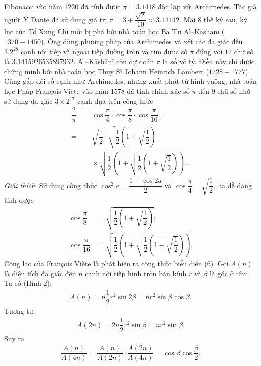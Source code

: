 \begin{multicols}{2}
	\vskip 0.1cm 
	Fibonacci vào năm $1220$ đã tính được $\pi  = 3.1418$  độc lập với Archimedes. 
	\vskip 0.1cm
	Tác giả người Ý Dante đã sử dụng giá trị  $\pi  = 3 + \dfrac{{\sqrt 2 }}{{10}} \approx 3.14142.$
	\vskip 0.1cm 
	Mãi $8$ thế kỷ sau, kỷ lục của Tổ Xung Chi mới bị phá bởi nhà toán học Ba Tư Al--Kāshānī ($1370-1450$). Ông dùng phương pháp của Archimedes và xét các đa giác đều $3.2^{28}$ cạnh nội tiếp và ngoại tiếp đường tròn và tìm được số $\pi$ đúng với $17$ chữ số là $3.1415926535897932$.  Al--Kāshānī còn dự đoán $\pi$ là số vô tỷ. Điều này chỉ được chứng minh bởi nhà toán học Thụy Sĩ Johann Heinrich Lambert ($1728 - 1777$).
	\vskip 0.1cm 
	Cũng gấp đôi số cạnh như Archimedes, nhưng xuất phát từ hình vuông, nhà toán học Pháp François Viète vào năm $1578$ đã tính chính xác số $\pi$  đến $9$ chữ số nhờ sử dụng đa giác  $3 \times 2^{17}$ cạnh dựa trên công thức
	\begin{align*}
			\dfrac{2}{\pi } = &\cos \dfrac{\pi }{4} \cdot \cos \dfrac{\pi }{8} \cdot \cos \dfrac{\pi }{{16}}...\\
			= &\sqrt {\dfrac{1}{2}}  \cdot \sqrt {\dfrac{1}{2}\left( {1 + \sqrt {\dfrac{1}{2}} } \right)}  \\
			 &\!\times\!\sqrt {\dfrac{1}{2}\left( {1 \!+\! \sqrt {\dfrac{1}{2}\left(\! {1 \!+\! \sqrt {\dfrac{1}{2}} } \!\right)} } \right)} ... \tag{$6$}
	\end{align*}
	\textit{Giải thích}: Sử dụng công thức ${\cos ^2}a = \dfrac{{1 + \cos 2a}}{2}$  và $\cos \dfrac{\pi }{4} = \sqrt {\dfrac{1}{2}},$ ta dễ dàng tính được 
	\begin{align*}
		\cos \dfrac{\pi }{8} &= \sqrt {\dfrac{1}{2}\left( {1 + \sqrt {\dfrac{1}{2}} } \right)};\\
		\cos \dfrac{\pi }{{16}} &= \sqrt {\dfrac{1}{2}\left( {1 + \sqrt {\dfrac{1}{2}\left( {1 + \sqrt {\dfrac{1}{2}} } \right)} } \right)}.
	\end{align*}
	Công lao của François Viète là phát hiện ra công thức biểu diễn ($6$).
	\vskip 0.1cm
	Gọi $A(n)$  là diện tích đa giác đều $n$  cạnh nội tiếp hình tròn bán kính  $r$ và $\beta$ là góc ở tâm.  Ta có (Hình $2$):
	\begin{align*}
		A(n) = n\dfrac{1}{2}{r^2}\sin 2\beta  = n{r^2}\sin \beta \cos \beta .
	\end{align*}
	Tương tự,  
	\begin{align*}
		A(2n) = 2n\dfrac{1}{2}{r^2}\sin \beta  = n{r^2}\sin \beta .
	\end{align*}
	Suy ra
	\begin{align*}
		\dfrac{{A(n)}}{{A(4n)}} = \dfrac{{A(n)}}{{A(2n)}}\cdot\dfrac{{A(2n)}}{{A(4n)}} = \cos \beta \cos \dfrac{\beta }{2}.

\end{align*}
\end{multicols}
